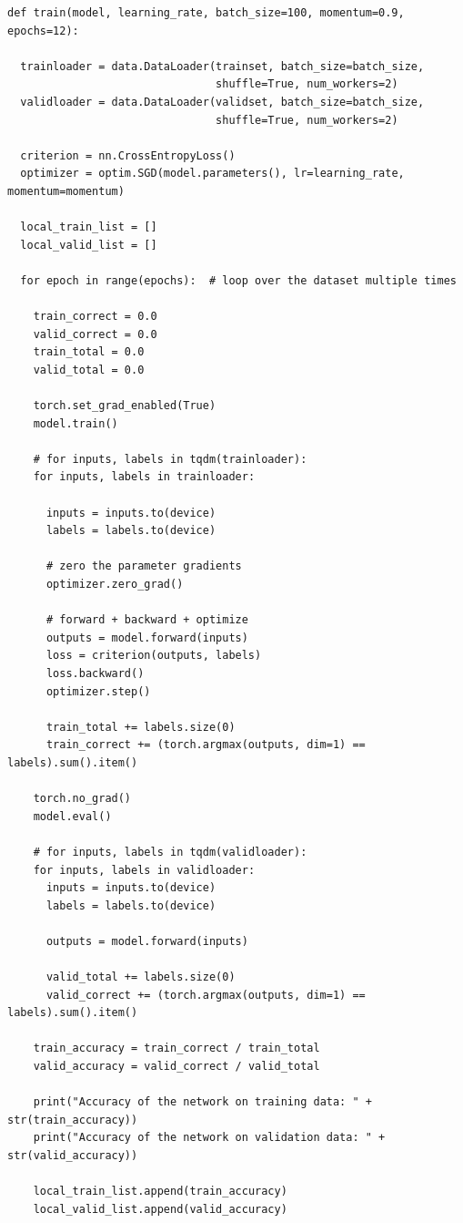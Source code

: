\documentclass{article}
\newcommand{\1}{\mathbf{1}}
\begin{document}
{\begin{verbatim}
def train(model, learning_rate, batch_size=100, momentum=0.9, epochs=12):

  trainloader = data.DataLoader(trainset, batch_size=batch_size,
                                shuffle=True, num_workers=2)
  validloader = data.DataLoader(validset, batch_size=batch_size,
                                shuffle=True, num_workers=2)

  criterion = nn.CrossEntropyLoss()
  optimizer = optim.SGD(model.parameters(), lr=learning_rate, momentum=momentum)

  local_train_list = []
  local_valid_list = []

  for epoch in range(epochs):  # loop over the dataset multiple times

    train_correct = 0.0
    valid_correct = 0.0
    train_total = 0.0
    valid_total = 0.0

    torch.set_grad_enabled(True)
    model.train()

    # for inputs, labels in tqdm(trainloader):
    for inputs, labels in trainloader:

      inputs = inputs.to(device)
      labels = labels.to(device)

      # zero the parameter gradients
      optimizer.zero_grad()

      # forward + backward + optimize
      outputs = model.forward(inputs)
      loss = criterion(outputs, labels)
      loss.backward()
      optimizer.step()
        
      train_total += labels.size(0)
      train_correct += (torch.argmax(outputs, dim=1) == labels).sum().item()
    
    torch.no_grad()
    model.eval()

    # for inputs, labels in tqdm(validloader):
    for inputs, labels in validloader:
      inputs = inputs.to(device)
      labels = labels.to(device)

      outputs = model.forward(inputs)
        
      valid_total += labels.size(0)
      valid_correct += (torch.argmax(outputs, dim=1) == labels).sum().item()

    train_accuracy = train_correct / train_total
    valid_accuracy = valid_correct / valid_total

    print("Accuracy of the network on training data: " + str(train_accuracy))
    print("Accuracy of the network on validation data: " + str(valid_accuracy))

    local_train_list.append(train_accuracy)
    local_valid_list.append(valid_accuracy)


\end{verbatim}}
\end{document}
